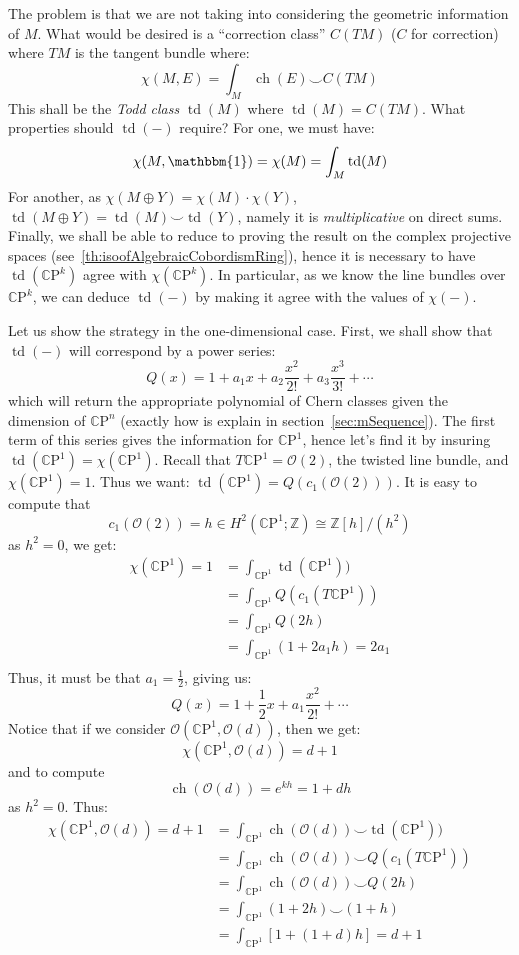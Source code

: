 \documentclass{book}
\newcommand{\Z}{{\mathbb{Z}}}
\newcommand{\CO}{{\mathcal{O}}}
\newcommand{\CP}{{\mathbb{C}\mathrm{P}}}
\newcommand{\ch}{{\operatorname{ch}}}
\newcommand{\td}{{\operatorname{td}}}
\renewcommand{\ch}{{\operatorname{ch}}}
\begin{document}
The problem is that we are not taking into considering the geometric information of $M$. What would be desired
is a ``correction class'' $C(TM)$ ($C$ for correction) where $TM$ is the tangent bundle where:
\[
  \chi(M, E) = \int_M \ch(E) \smile C(TM)
\]
This shall be the \emph{Todd class} $\td(M)$ where $\td(M) = C(TM)$. What properties should $\td(-)$ require? For one, we must have:
\[
  \chi(M, \mathbbm{1}) = \chi(M) = \int_M \td(M)
\]
For another, as $\chi(M\oplus Y) = \chi(M)\cdot \chi(Y)$, $\td(M\oplus Y) = \td(M)\smile \td(Y)$, namely it is
\emph{multiplicative} on direct sums. Finally, we shall be able to reduce to proving the result on the complex
projective spaces (see~\cref{th:isoofAlgebraicCobordismRing}), hence
it is necessary to have $\td(\CP^k)$ agree with $\chi(\CP^k)$. In particular, as we know the line bundles over
$\CP^k$, we can deduce $\td(-)$ by making it agree with the values of $\chi(-)$.

Let us show the strategy in the one-dimensional case. First, we shall show that
$\td(-)$ will correspond by a power series:
\[
  Q(x) = 1 + a_1x + a_2\frac{x^2}{2!} + a_3 \frac{x^3}{3!} +  \cdots
\]
which will return the appropriate polynomial of Chern classes given the dimension of $\CP^n$ (exactly how is explain
in section~\ref{sec:mSequence}). The first term of this series gives the information for $\CP^1$, hence let's
find it by insuring $\td(\CP^1) = \chi(\CP^1)$. Recall that $T\CP^1 = \CO(2)$, the twisted line bundle, and
$\chi(\CP^1) = 1$. Thus we want: $\td(\CP^1) = Q\left(c_1(\CO(2))\right)$. It is easy to compute that
\[
  c_1(\CO(2)) = h \in H^2(\CP^1; \Z) \cong \Z[h]/(h^2)
\]
as $h^2 = 0$, we get:
\begin{align*}
  \chi(\CP^1) = 1 &= \int_{\CP^1} \td(\CP^1))\\
  &= \int_{\CP^1} Q(c_1(T\CP^1))\\
  &= \int_{\CP^1} Q(2h)\\
  &= \int_{\CP^1} (1 + 2a_1h) = 2a_1\\
\end{align*}
Thus, it must be that $a_1 = \frac{1}{2}$, giving us:
\[
  Q(x) = 1 + \frac{1}{2}x + a_1 \frac{x^2}{2!} + \cdots
\]
Notice that if we consider $\CO(\CP^1, \CO(d))$, then we get:
\[
  \chi(\CP^1, \CO(d)) = d+1
\]
and to compute
\[
  \ch(\CO(d)) = e^{kh} = 1 + dh
\]
as $h^2 = 0$. Thus:
\begin{align*}
  \chi(\CP^1, \CO(d)) = d+1 &= \int_{\CP^1} \ch(\CO(d)) \smile \td(\CP^1))\\
  &= \int_{\CP^1} \ch(\CO(d)) \smile Q(c_1(T\CP^1))\\
  &= \int_{\CP^1} \ch(\CO(d)) \smile Q(2h)\\
  &= \int_{\CP^1} (1+2h) \smile (1 + h)\\
  &= \int_{\CP^1} [1 + (1 + d)h] = d+1
\end{align*}
\end{document}
